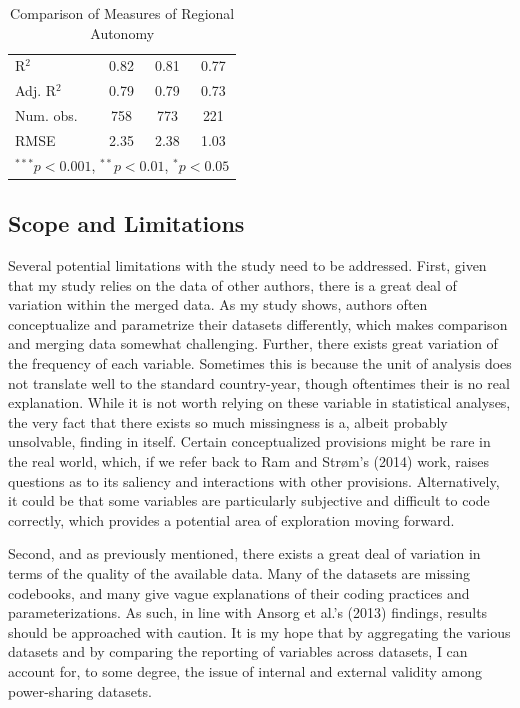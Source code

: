 \documentclass[12pt]{article}
\begin{document}
\begin{table}[!htbp]
\begin{center}
\begin{tabular}{l c c c }
			R$^2$                                & 0.82          & 0.81     & 0.77     \\
			Adj. R$^2$                           & 0.79          & 0.79     & 0.73     \\
			Num. obs.                            & 758           & 773      & 221      \\
			RMSE                                 & 2.35          & 2.38     & 1.03     \\
			\hline
			\multicolumn{4}{l}{\scriptsize{$^{***}p<0.001$, $^{**}p<0.01$, $^*p<0.05$}}
		\end{tabular}
		\caption{Comparison of Measures of Regional Autonomy}
		\label{table:coefficients}
	\end{center}
\end{table}

 
\subsection{Scope and Limitations}
Several potential limitations with the study need to be addressed. First, given that my study relies on the data of other authors, there is a great deal of variation within the merged data. As my study shows, authors often conceptualize and parametrize their datasets differently, which makes comparison and merging data somewhat challenging. Further, there exists great variation of the frequency of each variable. Sometimes this is because the unit of analysis does not translate well to the standard country-year, though oftentimes their is no real explanation. While it is not worth relying on these variable in statistical analyses, the very fact that there exists so much missingness is a, albeit probably unsolvable, finding in itself. Certain conceptualized provisions might be rare in the real world, which, if we refer back to Ram and Strøm’s (2014) work, raises questions as to its saliency and interactions with other provisions. Alternatively, it could be that some variables are particularly subjective and difficult to code correctly, which provides a potential area of exploration moving forward. 

Second, and as previously mentioned, there exists a great deal of variation in terms of the quality of the available data. Many of the datasets are missing codebooks, and many give vague explanations of their coding practices and parameterizations. As such, in line with Ansorg et al.’s (2013) findings, results should be approached with caution. It is my hope that by aggregating the various datasets and by comparing the reporting of variables across datasets, I can account for, to some degree, the issue of internal and external validity among power-sharing datasets.
\end{document}
